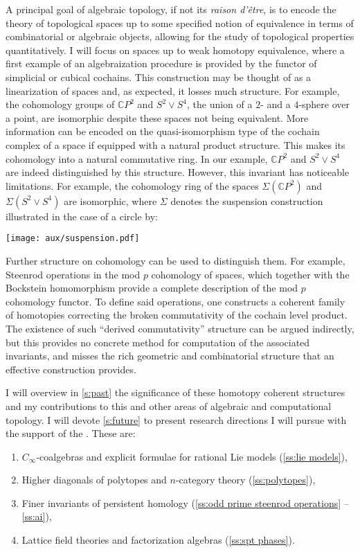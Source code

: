 A principal goal of algebraic topology, if not its \emph{raison d'\^{e}tre}, is to encode the theory of topological spaces up to some specified notion of equivalence in terms of combinatorial or algebraic objects, allowing for the study of topological properties quantitatively.
I will focus on spaces up to weak homotopy equivalence, where a first example of an algebraization procedure is provided by the functor of simplicial or cubical cochains.
This construction may be thought of as a linearization of spaces and, as expected, it losses much structure.
For example, the cohomology groups of $\mathbb{C} P^2$ and $S^2 \vee S^4$, the union of a $2$- and a $4$-sphere over a point, are isomorphic despite these spaces not being equivalent.
More information can be encoded on the quasi-isomorphism type of the cochain complex of a space if equipped with a natural product structure.
This makes its cohomology into a natural commutative ring.
In our example, $\mathbb{C} P^2$ and $S^2 \vee S^4$ are indeed distinguished by this structure.
However, this invariant has noticeable limitations.
For example, the cohomology ring of the spaces $\Sigma(\mathbb{C} P^2)$ and $\Sigma(S^2 \vee S^4)$ are isomorphic, where $\Sigma$ denotes the suspension construction illustrated in the case of a circle by:
\begin{center}
	\texttt{[image: aux/suspension.pdf]}
\end{center}
Further structure on cohomology can be used to distinguish them.
For example, Steenrod operations in the mod $p$ cohomology of spaces, which together with the Bockstein homomorphism provide a complete description of the mod $p$ cohomology functor.
To define said operations, one constructs a coherent family of homotopies correcting the broken commutativity of the cochain level product.
The existence of such ``derived commutativity'' structure can be argued indirectly, but this provides no concrete method for computation of the associated invariants, and misses the rich geometric and combinatorial structure that an effective construction provides.

I will overview in \cref{s:past} the significance of these homotopy coherent structures and my contributions to this and other areas of algebraic and computational topology.
I will devote \cref{s:future} to present research directions I will pursue with the support of the \grantName.
These are:

\begin{enumerate}
	\item $C_\infty$-coalgebras and explicit formulae for rational Lie models (\cref{ss:lie models}),
	\item Higher diagonals of polytopes and $n$-category theory (\cref{ss:polytopes}),
	\item Finer invariants of persistent homology (\cref{ss:odd prime steenrod operations} -- \cref{ss:ai}),
	\item Lattice field theories and factorization algebras (\cref{ss:spt phases}).
\end{enumerate}

